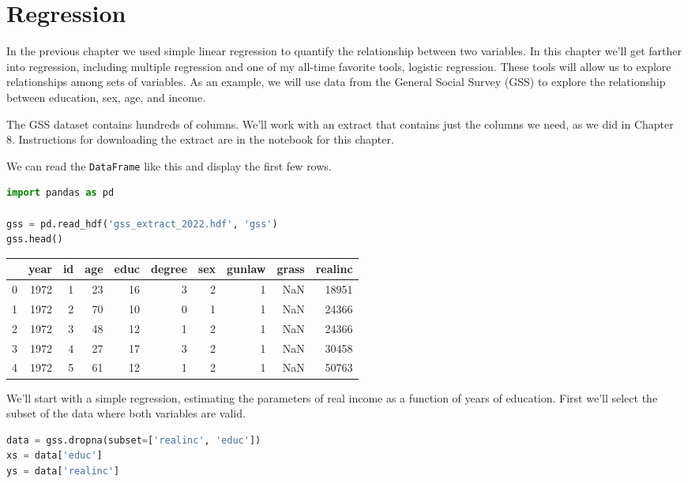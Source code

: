 \chapter{Regression}\label{regression}

In the previous chapter we used simple linear regression to quantify the
relationship between two variables. In this chapter we'll get farther
into regression, including multiple regression and one of my all-time
favorite tools, logistic regression. These tools will allow us to
explore relationships among sets of variables. As an example, we will
use data from the General Social Survey (GSS) to explore the
relationship between education, sex, age, and income.

The GSS dataset contains hundreds of columns. We'll work with an extract
that contains just the columns we need, as we did in Chapter 8.
Instructions for downloading the extract are in the notebook for this
chapter.

We can read the \passthrough{\lstinline!DataFrame!} like this and
display the first few rows.

\begin{lstlisting}[language=Python,style=source]
import pandas as pd

gss = pd.read_hdf('gss_extract_2022.hdf', 'gss')
gss.head()
\end{lstlisting}

\begin{tabular}{lrrrrrrrrr}
\midrule
 & year & id & age & educ & degree & sex & gunlaw & grass & realinc \\
\midrule
0 & 1972 & 1 & 23 & 16 & 3 & 2 & 1 & NaN & 18951 \\
1 & 1972 & 2 & 70 & 10 & 0 & 1 & 1 & NaN & 24366 \\
2 & 1972 & 3 & 48 & 12 & 1 & 2 & 1 & NaN & 24366 \\
3 & 1972 & 4 & 27 & 17 & 3 & 2 & 1 & NaN & 30458 \\
4 & 1972 & 5 & 61 & 12 & 1 & 2 & 1 & NaN & 50763 \\
\midrule
\end{tabular}

We'll start with a simple regression, estimating the parameters of real
income as a function of years of education. First we'll select the
subset of the data where both variables are valid.

\begin{lstlisting}[language=Python,style=source]
data = gss.dropna(subset=['realinc', 'educ'])
xs = data['educ']
ys = data['realinc']
\end{lstlisting}

